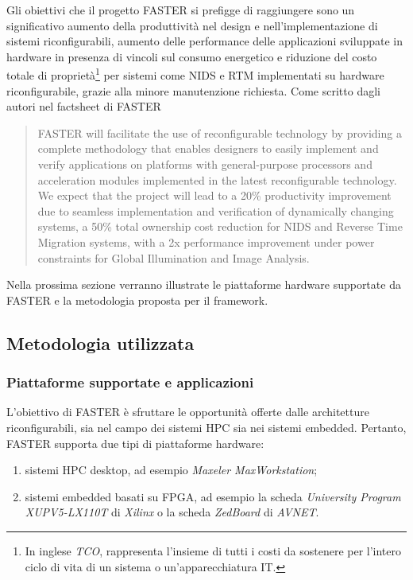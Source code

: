 Gli obiettivi che il progetto \ac{FASTER} si prefigge di raggiungere sono un 
significativo aumento della produttività nel design e nell'implementazione di 
sistemi riconfigurabili, aumento delle performance delle applicazioni 
sviluppate in hardware in presenza di vincoli sul consumo energetico e 
riduzione del costo totale di proprietà\footnote{In inglese \emph{\ac{TCO}}, 
rappresenta l'insieme di tutti i costi da sostenere per l'intero ciclo di 
vita di un sistema o un'apparecchiatura IT.} per sistemi come \ac{NIDS} e 
\ac{RTM} \cite{RTMArticle} implementati su hardware riconfigurabile, grazie alla minore 
manutenzione richiesta. Come scritto dagli autori nel factsheet di \ac{FASTER}
\cite{FasterFactsheet}


\begin{quotation}
  \ac{FASTER} will facilitate the use of reconfigurable technology by providing a complete
  methodology that enables designers to easily implement and verify applications on
  platforms with general-purpose processors and acceleration modules implemented in the
  latest reconfigurable technology.
  We expect that the 
  project will lead to a 20\% productivity improvement due to seamless 
  implementation and verification of dynamically changing systems, a 50\% total 
  ownership cost reduction for NIDS and Reverse Time Migration systems, with a 2x 
  performance improvement under power constraints for Global Illumination and 
  Image Analysis.
\end{quotation}


Nella prossima sezione verranno illustrate le piattaforme hardware supportate 
da \ac{FASTER} e la metodologia proposta per il framework. 


\subsection{Metodologia utilizzata}
\label{sec:fasterMetodologia}

\subsubsection{Piattaforme supportate e applicazioni}
L'obiettivo di \ac{FASTER} è sfruttare le opportunità offerte dalle 
architetture riconfigurabili, sia nel campo dei sistemi \ac{HPC} sia nei 
sistemi embedded. Pertanto, \ac{FASTER} supporta due tipi di piattaforme 
hardware:
\begin{enumerate}
 \item sistemi \ac{HPC} desktop, ad esempio \emph{Maxeler MaxWorkstation};%
 \item sistemi embedded basati su \ac{FPGA}, ad esempio la 
scheda \emph{University Program XUPV5-LX110T} di \emph{Xilinx} o la scheda 
\emph{ZedBoard} di \emph{AVNET}.
\end{enumerate}

